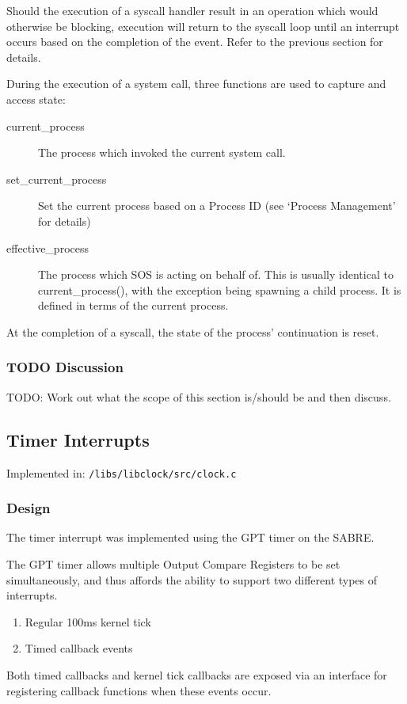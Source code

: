 \documentclass[a4paper,12pt]{article}
\begin{document}
Should the execution of a syscall handler result in an operation which would
otherwise be blocking, execution will return to the syscall loop until an
interrupt occurs based on the completion of the event.  Refer to the previous
section for details.

During the execution of a system call, three functions are used to capture and
access state:
\begin{description}
\item[current\_process] The process which invoked the current system call.
\item[set\_current\_process] Set the current process based on a Process ID (see
  `Process Management' for details)
\item[effective\_process] The process which SOS is acting on behalf of.  This
  is usually identical to current\_process(), with the exception being spawning
  a child process.  It is defined in terms of the current process.
\end{description}
At the completion of a syscall, the state of the process' continuation is
reset.

\subsubsection{TODO Discussion}
TODO: Work out what the scope of this section is/should be and then discuss.

\subsection{Timer Interrupts}
Implemented in: \texttt{/libs/libclock/src/clock.c}

\subsubsection{Design}
The timer interrupt was implemented using the GPT timer on the SABRE.

The GPT timer allows multiple Output Compare Registers to be set
simultaneously, and thus affords the ability to support two different types of
interrupts.

\begin{enumerate}
\item Regular 100ms kernel tick
\item Timed callback events
\end{enumerate}

Both timed callbacks and kernel tick callbacks are exposed via an interface
for registering callback functions when these events occur.
\end{document}

